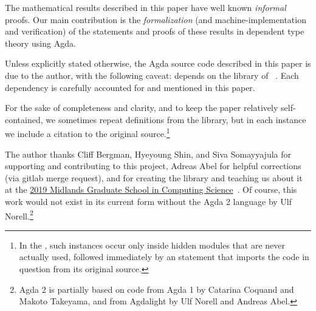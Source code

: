 The mathematical results described in this paper have well known \emph{informal} proofs. Our main contribution is the \emph{formalization} (and machine-implementation and verification) of the statements and proofs of these results in dependent type theory using Agda.

Unless explicitly stated otherwise, the Agda source code described in this paper is due to the author, with the following caveat: \ualib depends on the \typetopology library of \MartinEscardo~\cite{MHE}.  Each dependency is carefully accounted for and mentioned in this paper.

For the sake of completeness and clarity, and to keep the paper relatively self-contained, we sometimes repeat definitions from the \typetopology library, but in each instance we include a citation to the original source.\footnote{In the \ualib, such instances occur only inside hidden modules that are never actually used, followed immediately by an statement that imports the code in question from its original source.}

The author thanks Cliff Bergman, Hyeyoung Shin, and Siva Somayyajula for supporting and contributing to this project, Adreas Abel for helpful corrections (via gitlab merge request), and \MartinEscardo for creating the \TypeTopology library and teaching us about it at the \href{http://events.cs.bham.ac.uk/mgs2019/}{2019 Midlands Graduate School in Computing Science}~\cite{MHE}. Of course, this work would not exist in its current form without the Agda 2 language by Ulf Norell.\footnote{Agda 2 is partially based on code from Agda 1 by Catarina Coquand and Makoto Takeyama, and from Agdalight by Ulf Norell and Andreas Abel.}
